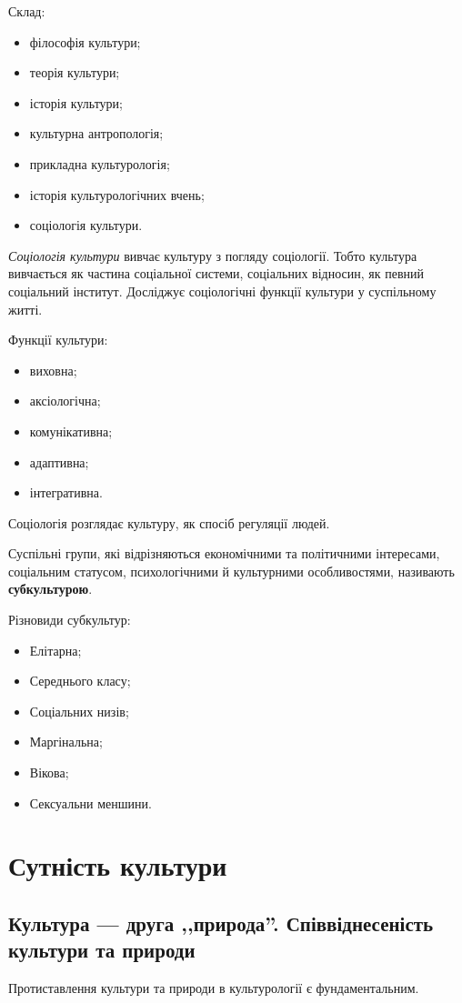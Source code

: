 \documentclass[a5paper,10pt,titlepage,pdftex,headsepline]{scrartcl}
\begin{document}
Склад:
\begin{itemize}
  \item філософія культури;
  \item теорія культури;
  \item історія культури;
  \item культурна антропологія;
  \item прикладна культурологія;
  \item історія культурологічних вчень;
  \item соціологія культури.
\end{itemize}

\textit{Соціологія культури} вивчає культуру з погляду соціології.
Тобто культура вивчається як частина соціальної системи, соціальних відносин, як певний соціальний інститут.
Досліджує соціологічні функції культури у суспільному житті.

Функції культури:
\begin{itemize}
  \item виховна;
  \item аксіологічна;
  \item комунікативна;
  \item адаптивна;
  \item інтегративна.
\end{itemize}

Соціологія розглядає культуру, як спосіб регуляції людей.

Суспільні групи, які відрізняються економічними та політичними інтересами, соціальним статусом, психологічними й культурними особливостями, називають \textbf{субкультурою}.

Різновиди субкультур:
\begin{itemize}
  \item Елітарна;
  \item Середнього класу;
  \item Соціальних низів;
  \item Маргінальна;
  \item Вікова;
  \item Сексуальни меншини.
\end{itemize}
\section{Сутність культури}
\subsection{Культура --- друга ,,природа''. Співвіднесеність культури та природи}
Протиставлення культури та природи в культурології є фундаментальним.
\end{document}
